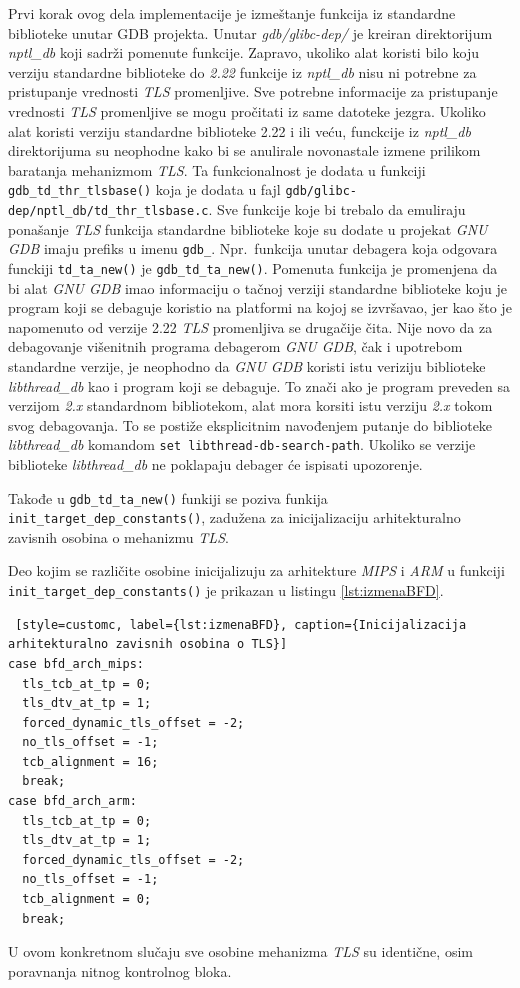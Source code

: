 \documentclass[12pt,oneside]{memoir}
\begin{document}
Prvi korak ovog dela implementacije je izmeštanje funkcija iz standardne biblioteke unutar GDB projekta. Unutar \emph{gdb/glibc-dep/} je kreiran direktorijum \emph{nptl\_db} koji sadrži pomenute funkcije. Zapravo, ukoliko alat koristi bilo koju verziju standardne biblioteke do \emph{2.22} funkcije iz \emph{nptl\_db} nisu ni potrebne za pristupanje vrednosti \emph{TLS} promenljive. Sve potrebne informacije za pristupanje vrednosti \emph{TLS} promenljive se mogu pročitati iz same datoteke jezgra. Ukoliko alat koristi verziju standardne biblioteke 2.22 i ili veću, funckcije iz \emph{nptl\_db} direktorijuma su neophodne kako bi se anulirale novonastale izmene prilikom baratanja mehanizmom \emph{TLS}. Ta funkcionalnost je dodata u funkciji \texttt{gdb\_td\_thr\_tlsbase()} koja je dodata u fajl \texttt{gdb/glibc-dep/nptl\_db/td\_thr\_tlsbase.c}.
Sve funkcije koje bi trebalo da emuliraju ponašanje \emph{TLS} funkcija standardne biblioteke koje su dodate u projekat \emph{GNU GDB} imaju prefiks u imenu \texttt{gdb\_}. Npr.~funkcija unutar debagera koja odgovara funckiji \texttt{td\_ta\_new()} je \texttt{gdb\_td\_ta\_new()}. Pomenuta funkcija je promenjena da bi alat \emph{GNU GDB} imao informaciju o tačnoj verziji standardne biblioteke koju je program koji se debaguje koristio na platformi na kojoj se izvršavao, jer kao što je napomenuto od verzije 2.22 \emph{TLS} promenljiva se drugačije čita. Nije novo da za debagovanje višenitnih programa debagerom \emph{GNU GDB}, čak i upotrebom standardne verzije, je neophodno da \emph{GNU GDB} koristi istu veriziju biblioteke \emph{libthread\_db} kao i program koji se debaguje. To znači ako je program preveden sa verzijom \emph{2.x} standardnom bibliotekom, alat mora korsiti istu verziju \emph{2.x} tokom svog debagovanja. To se postiže eksplicitnim navođenjem putanje do biblioteke \emph{libthread\_db} komandom \texttt{set libthread-db-search-path}. Ukoliko se verzije biblioteke \emph{libthread\_db} ne poklapaju debager će ispisati upozorenje.

Takođe u \texttt{gdb\_td\_ta\_new()} funkiji se poziva funkija \texttt{init\_target\_dep\_constants()}, zadužena za inicijalizaciju arhitekturalno zavisnih osobina o mehanizmu \emph{TLS}.

Deo kojim se različite osobine inicijalizuju za arhitekture \emph{MIPS} i \emph{ARM} u funkciji \texttt{init\_target\_dep\_constants()} je prikazan u listingu \ref{lst:izmenaBFD}.
\begin{lstlisting} [style=customc, label={lst:izmenaBFD}, caption={Inicijalizacija arhitekturalno zavisnih osobina o TLS}]
case bfd_arch_mips:
  tls_tcb_at_tp = 0;
  tls_dtv_at_tp = 1;
  forced_dynamic_tls_offset = -2;
  no_tls_offset = -1;
  tcb_alignment = 16;
  break;
case bfd_arch_arm:
  tls_tcb_at_tp = 0;
  tls_dtv_at_tp = 1;
  forced_dynamic_tls_offset = -2;
  no_tls_offset = -1;
  tcb_alignment = 0;
  break;
\end{lstlisting}
U ovom konkretnom slučaju sve osobine mehanizma \emph{TLS} su identične, osim poravnanja nitnog kontrolnog bloka.
\end{document}
